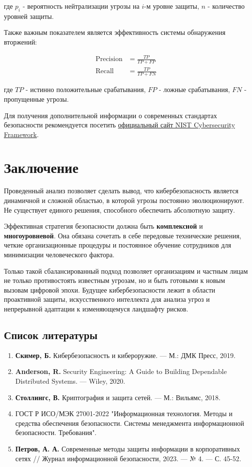 \documentclass[14pt]{extreport}
\begin{document}
где $p_i$ - вероятность нейтрализации угрозы на $i$-м уровне защиты, $n$ - количество уровней защиты.

Также важным показателем является эффективность системы обнаружения вторжений:

\begin{align}
\text{Precision} &= \frac{TP}{TP + FP} \\
\text{Recall} &= \frac{TP}{TP + FN}
\label{eq:metrics}
\end{align}

где $TP$ - истинно положительные срабатывания, $FP$ - ложные срабатывания, $FN$ - пропущенные угрозы.

Для получения дополнительной информации о современных стандартах безопасности рекомендуется посетить \href{https://www.nist.gov/cyberframework}{официальный сайт NIST Cybersecurity Framework}.

\chapter{Заключение}
\label{chap:conclusion}

Проведенный анализ позволяет сделать вывод, что кибербезопасность является динамичной и сложной областью, в которой угрозы постоянно эволюционируют. Не существует единого решения, способного обеспечить абсолютную защиту.

Эффективная стратегия безопасности должна быть \textbf{комплексной} и \textbf{многоуровневой}. Она обязана сочетать в себе передовые технические решения, четкие организационные процедуры и постоянное обучение сотрудников для минимизации человеческого фактора.

Только такой сбалансированный подход позволяет организациям и частным лицам не только противостоять известным угрозам, но и быть готовыми к новым вызовам цифровой эпохи. Будущее кибербезопасности лежит в области проактивной защиты, искусственного интеллекта для анализа угроз и непрерывной адаптации к изменяющемуся ландшафту рисков.

\section*{Список литературы}
\begin{enumerate}
    \item \textbf{Скимер, Б.} Кибербезопасность и кибероружие. — М.: ДМК Пресс, 2019.
    \item \textbf{Anderson, R.} Security Engineering: A Guide to Building Dependable Distributed Systems. — Wiley, 2020.
    \item \textbf{Столлингс, В.} Криптография и защита сетей. — М.: Вильямс, 2018.
    \item ГОСТ Р ИСО/МЭК 27001-2022 "Информационная технология. Методы и средства обеспечения безопасности. Системы менеджмента информационной безопасности. Требования".
    \item \textbf{Петров, А. А.} Современные методы защиты информации в корпоративных сетях // Журнал информационной безопасности, 2023. — № 4. — С. 45-52.
\end{enumerate}
\end{document}
